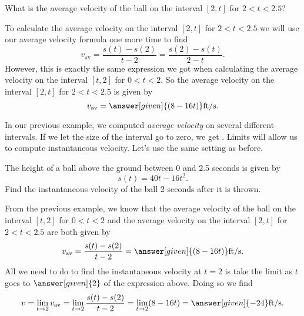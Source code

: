 \documentclass{ximera}
\begin{document}
\begin{example}
\begin{explanation}
\end{explanation}

What is the average velocity of the ball on the interval $[2,t]$ for
$2<t<2.5$?

\begin{explanation}

To calculate the average velocity on the interval $[2,t]$ for 
$2<t<2.5$ we will use our average velocity formula one more time
to find
\[
v_{\text{av}} = \frac{s(t)-s(2)}{t-2} = \frac{s(2)-s(t)}{2-t}. 
\]
However, this is exactly the same expression we got when calculating
the average velocity on the interval $[t,2]$ for $0<t<2$.  So the 
average velocity on the interval $[2,t]$ for $2<t<2.5$ is given by
\[
v_{\text{av}} =\answer[given]{(8-16t)}\text{ft/s.}
\]
\end{explanation}
\end{example}

In our previous example, we computed \textit{average velocity} on
several different intervals. If we let the size of the interval go to
zero, we get . Limits will allow us to
compute instantaneous velocity.  Let's use the same setting as before.

\begin{example}
The height of a ball above the ground between 0 and 2.5 seconds
is given by
\[
s(t) = 40t - 16t^2.
\] 
Find the instantaneous velocity of the ball 2 seconds after it
is thrown.
\begin{explanation}
From the previous example, we know that the average velocity of the
ball on the interval $[t,2]$ for $0<t<2$ and the average velocity
on the interval $[2,t]$ for $2<t<2.5$ are both given by
\[
v_{\text{av}} =  \frac{s(t)-s(2)}{t-2}= \answer[given]{(8-16t)}\text{ft/s.}
\]
All we need to do to find the instantaneous velocity at $t=2$ is 
take the limit as $t$ goes to $\answer[given]{2}$ of the expression
above.  Doing so we find
\[
v = \lim_{t\to2}v_{\text{av}}
=\lim_{t\to2}  \frac{s(t)-s(2)}{t-2}
= \lim_{t\to2}(8-16t)
= \answer[given]{-24}\text{ft/s.}
\]
\end{explanation}
\end{example}
\end{document}
